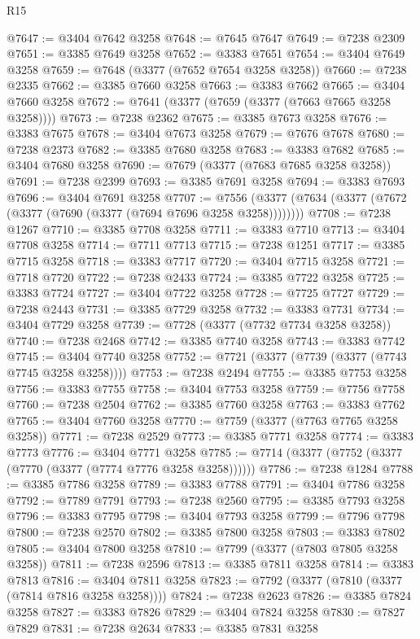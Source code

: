 \begin{lexlean}{R15}
\begin{coremodule}
@7647 := @3404 @7642 @3258
@7648 := @7645 @7647
@7649 := @7238 @2309
@7651 := @3385 @7649 @3258
@7652 := @3383 @7651
@7654 := @3404 @7649 @3258
@7659 := @7648 (@3377 (@7652 @7654 @3258 @3258))
@7660 := @7238 @2335
@7662 := @3385 @7660 @3258
@7663 := @3383 @7662
@7665 := @3404 @7660 @3258
@7672 := @7641 (@3377 (@7659 (@3377 (@7663 @7665 @3258 @3258))))
@7673 := @7238 @2362
@7675 := @3385 @7673 @3258
@7676 := @3383 @7675
@7678 := @3404 @7673 @3258
@7679 := @7676 @7678
@7680 := @7238 @2373
@7682 := @3385 @7680 @3258
@7683 := @3383 @7682
@7685 := @3404 @7680 @3258
@7690 := @7679 (@3377 (@7683 @7685 @3258 @3258))
@7691 := @7238 @2399
@7693 := @3385 @7691 @3258
@7694 := @3383 @7693
@7696 := @3404 @7691 @3258
@7707 := @7556 (@3377 (@7634 (@3377 (@7672 (@3377 (@7690 (@3377 (@7694 @7696 @3258 @3258))))))))
@7708 := @7238 @1267
@7710 := @3385 @7708 @3258
@7711 := @3383 @7710
@7713 := @3404 @7708 @3258
@7714 := @7711 @7713
@7715 := @7238 @1251
@7717 := @3385 @7715 @3258
@7718 := @3383 @7717
@7720 := @3404 @7715 @3258
@7721 := @7718 @7720
@7722 := @7238 @2433
@7724 := @3385 @7722 @3258
@7725 := @3383 @7724
@7727 := @3404 @7722 @3258
@7728 := @7725 @7727
@7729 := @7238 @2443
@7731 := @3385 @7729 @3258
@7732 := @3383 @7731
@7734 := @3404 @7729 @3258
@7739 := @7728 (@3377 (@7732 @7734 @3258 @3258))
@7740 := @7238 @2468
@7742 := @3385 @7740 @3258
@7743 := @3383 @7742
@7745 := @3404 @7740 @3258
@7752 := @7721 (@3377 (@7739 (@3377 (@7743 @7745 @3258 @3258))))
@7753 := @7238 @2494
@7755 := @3385 @7753 @3258
@7756 := @3383 @7755
@7758 := @3404 @7753 @3258
@7759 := @7756 @7758
@7760 := @7238 @2504
@7762 := @3385 @7760 @3258
@7763 := @3383 @7762
@7765 := @3404 @7760 @3258
@7770 := @7759 (@3377 (@7763 @7765 @3258 @3258))
@7771 := @7238 @2529
@7773 := @3385 @7771 @3258
@7774 := @3383 @7773
@7776 := @3404 @7771 @3258
@7785 := @7714 (@3377 (@7752 (@3377 (@7770 (@3377 (@7774 @7776 @3258 @3258))))))
@7786 := @7238 @1284
@7788 := @3385 @7786 @3258
@7789 := @3383 @7788
@7791 := @3404 @7786 @3258
@7792 := @7789 @7791
@7793 := @7238 @2560
@7795 := @3385 @7793 @3258
@7796 := @3383 @7795
@7798 := @3404 @7793 @3258
@7799 := @7796 @7798
@7800 := @7238 @2570
@7802 := @3385 @7800 @3258
@7803 := @3383 @7802
@7805 := @3404 @7800 @3258
@7810 := @7799 (@3377 (@7803 @7805 @3258 @3258))
@7811 := @7238 @2596
@7813 := @3385 @7811 @3258
@7814 := @3383 @7813
@7816 := @3404 @7811 @3258
@7823 := @7792 (@3377 (@7810 (@3377 (@7814 @7816 @3258 @3258))))
@7824 := @7238 @2623
@7826 := @3385 @7824 @3258
@7827 := @3383 @7826
@7829 := @3404 @7824 @3258
@7830 := @7827 @7829
@7831 := @7238 @2634
@7833 := @3385 @7831 @3258

\end{coremodule}
\end{lexlean}

